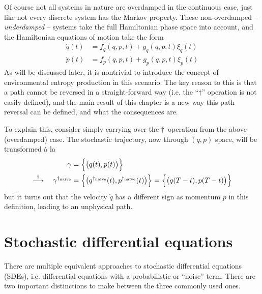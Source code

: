 Of course not all systems in nature are overdamped in the continuous case, just like not every discrete system has the Markov property. These non-overdamped -- \emph{underdamped} -- systems take the full Hamiltonian phase space into account, and the Hamiltonian equations of motion take the form
%
\begin{equation}\begin{split}
	\label{eqn:general hamiltonian equations}
	\dot q(t) &= f_q(q,p,t) + g_q(q,p,t)\xi_q(t) \\
	\dot p(t) &= f_p(q,p,t) + g_p(q,p,t)\xi_p(t)
\end{split}\end{equation}
%
As will be discussed later, it is nontrivial to introduce the concept of environmental entropy production in this scenario. The key reason to this is that a path cannot be reversed in a straight-forward way (i.e. the ``\(\dagger\)'' operation is not easily defined), and the main result of this chapter is a new way this path reversal can be defined, and what the consequences are.

To explain this, consider simply carrying over the \(\dagger\)~operation from the above (overdamped) case. The stochastic trajectory, now through \((q,p)\) space, will be transformed \`a la
%
\begin{equation}\begin{split}
	\gamma &= \Bigl\{\bigl(q(t),p(t)\bigr)\Bigr\}
	\\ \overset\dagger\longrightarrow \quad
	\gamma^{\dagger_\text{na\"ive}}
		&= \Bigl\{\bigl(q^{\dagger_\text{na\"ive}}(t),p^{\dagger_\text{na\"ive}}(t)\bigr)\Bigr\}
		= \Bigl\{\bigl(q(T-t),p(T-t)\bigr)\Bigr\}
\end{split}\end{equation}
%
but it turns out that the velocity \(\dot q\) has a different sign as momentum \(p\) in this definition, leading to an unphysical path.







\section{Stochastic differential equations}
\label{sec:sde}

There are multiple equivalent approaches to stochastic differential equations (SDEs), i.e. differential equations with a probabilistic or ``noise'' term. There are two important distinctions to make between the three commonly used ones.

